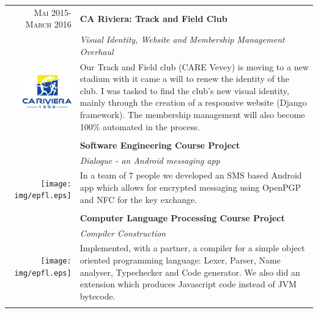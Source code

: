 \documentclass[a4paper,11pt]{article} %
\begin{document}
\begin{tabularx}{\textwidth}{r|X}

\textsc{Mai 2015-March 2016} & \textbf{CA Riviera: Track and Field Club} \\
\multirow{4}{*}{ \includegraphics[width=60pt]{img/cariviera.eps}}
& \emph{Visual Identity, Website and Membership Management Overhaul}\\ 
& \footnotesize{Our Track and Field club (CARE Vevey) is moving to a new stadium with it came a will to renew the identity of the club.
I was tasked to find the club's new visual identity, mainly through the creation of a responsive website (Django framework).
The membership management will also become 100\% automated in the process.}\\
\multicolumn{2}{c}{} \\


\textsc{Sept-Dec 2014} & \textbf{Software Engineering Course Project} \\
\multirow{4}{*}{ \texttt{[image: img/epfl.eps]}}
& \emph{Dialogue - an Android messaging app}\\ 
& \footnotesize{In a team of 7 people we developed an SMS based Android app which allows for encrypted messaging using OpenPGP
and NFC for the key exchange.}\\
\multicolumn{2}{c}{} \\


\textsc{Sept 2014-Jan 2015} & \textbf{Computer Language Processing Course Project}\\
\multirow{4}{*}{ \texttt{[image: img/epfl.eps]}}
& \emph{Compiler Construction}\\
& \footnotesize{Implemented, with a partner, a compiler for a simple object oriented programming language:
Lexer, Parser, Name analyser, Typechecker and Code generator.
We also did an extension which produces Javascript code instead of JVM bytecode.}\\
\multicolumn{2}{c}{} \\


\end{tabularx}
\end{document}
